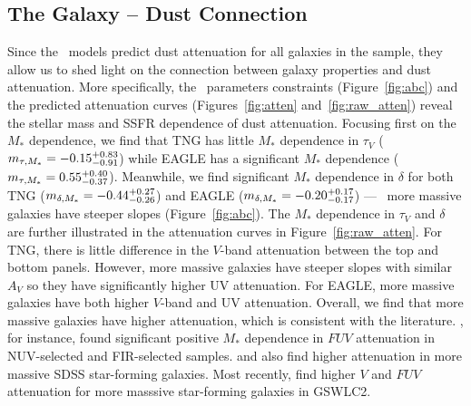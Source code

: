 \subsection{The Galaxy -- Dust Connection}  
Since the \eda~models predict dust attenuation for all galaxies in the sample,
they allow us to shed light on the
connection between galaxy properties and dust attenuation.  More specifically, 
the \eda~parameters constraints (Figure~\ref{fig:abc}) and the predicted
attenuation curves (Figures~\ref{fig:atten} and~\ref{fig:raw_atten}) reveal the
stellar mass and SSFR dependence of dust attenuation. 
Focusing first on the $M_*$ dependence, we find that TNG has little $M_*$
dependence in $\tau_V$ ($m_{\tau,M_*} = -0.15\substack{+0.83 \\ -0.91}$) while EAGLE
has a significant $M_*$ dependence ($m_{\tau,M_*} = 0.55\substack{+0.40 \\ -0.37}$).
Meanwhile, we find significant $M_*$ dependence in $\delta$ for both TNG 
($m_{\delta,M_*} = -0.44\substack{+0.27\\-0.26}$) and EAGLE ($m_{\delta,M_*} =
-0.20\substack{+0.17\\-0.17}$) --- \ie~more massive galaxies have steeper
slopes (Figure~\ref{fig:abc}). The $M_*$ dependence in $\tau_V$ and $\delta$
are further illustrated in the attenuation curves in Figure~\ref{fig:raw_atten}.
For TNG, there is little difference in the $V$-band attenuation between the 
top and bottom panels. However, more massive galaxies have steeper slopes 
with similar $A_V$ so they have significantly higher UV attenuation. For
EAGLE, more massive galaxies have both higher $V$-band and UV attenuation.
Overall, we find that more massive galaxies have higher attenuation,
which is consistent with the literature. \cite{burgarella2005}, for instance,
found significant positive $M_*$ dependence in $FUV$ attenuation in
NUV-selected and FIR-selected samples. \cite{garn2010} and \cite{battisti2016}
also find higher attenuation in more massive SDSS star-forming galaxies. Most
recently, \cite{salim2018} find higher $V$ and $FUV$ attenuation for more
masssive star-forming galaxies in GSWLC2. 

